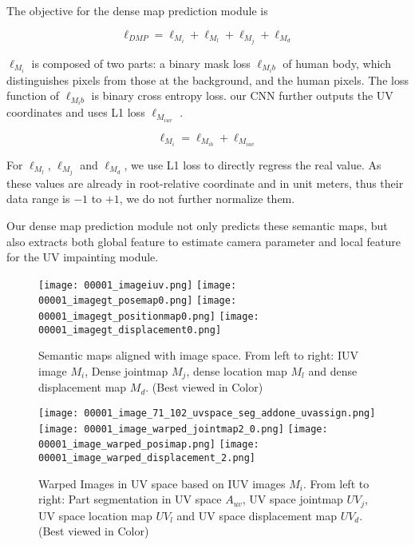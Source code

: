 \documentclass[10pt,twocolumn,letterpaper]{article}
\begin{document}
The objective for the dense map prediction module is 

\begin{equation}
{\ell_{DMP}} = {\ell_{M_i}} + {\ell_{M_l}} + {\ell_{M_j}} + {\ell_{M_d}} 
  \label{eqn:DMP}
\end{equation}

$\ell_{M_i}$ is composed of two parts: a binary mask loss $\ell_{M_ib}$ of human body, which distinguishes pixels from those at the background, and the human pixels. The loss function of $\ell_{M_ib}$ is binary cross entropy loss.  our CNN further outputs the UV coordinates and uses L1 loss $\ell_{M_{iuv}}$ . 

\begin{equation}
{\ell_{M_i}} = {\ell_{M_{ib}}} +   {\ell_{M_{iuv}}}
  \label{eqn:mi}
\end{equation}

For $\ell_{M_l}$,  $\ell_{M_j}$ and  $\ell_{M_d}$, we use L1 loss to directly regress the real value. As these values are already in root-relative coordinate and in unit meters, thus their data range is $-1$ to $+1$, we do not further normalize them.  

Our dense map prediction module not only predicts these semantic maps, but also extracts both global feature to estimate camera parameter and local feature for the UV impainting module.  


\begin{figure}
\centering
\texttt{[image: 00001\_imageiuv.png]}
\texttt{[image: 00001\_imagegt\_posemap0.png]}
\texttt{[image: 00001\_imagegt\_positionmap0.png]}
\texttt{[image: 00001\_imagegt\_displacement0.png]}
\caption{{Semantic maps aligned with image space. From left to right: IUV image $M_{i}$, Dense jointmap $M_{j}$, dense location map $M_{l}$ and dense displacement map $M_{d}$. (Best viewed in Color)}}
\label{fig:singlesample}
\end{figure}


\begin{figure}
\centering
\texttt{[image: 00001\_image\_71\_102\_uvspace\_seg\_addone\_uvassign.png]}
\texttt{[image: 00001\_image\_warped\_jointmap2\_0.png]}
\texttt{[image: 00001\_image\_warped\_posimap.png]}
\texttt{[image: 00001\_image\_warped\_displacement\_2.png]}
\caption{{Warped Images in UV space based on IUV images $M_i$. From left to right: Part segmentation in UV space $A_{uv}$, UV space jointmap $UV_{j}$, UV space location map $UV_{l}$ and UV space displacement map $UV_{d}$. (Best viewed in Color) }}
\label{fig:singlesamplewarped}
\end{figure}
\end{document}
